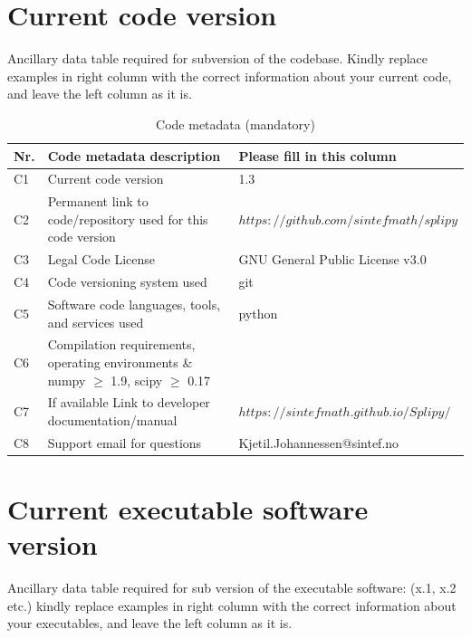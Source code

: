 \documentclass[preprint,12pt, a4paper]{elsarticle}
\begin{document}
\section*{Current code version}
\label{}

Ancillary data table required for subversion of the codebase. Kindly replace examples in right column with the correct information about your current code, and leave the left column as it is.

\begin{table}[!h]
\begin{tabular}{|l|p{6.5cm}|p{6.5cm}|}
\hline
\textbf{Nr.} & \textbf{Code metadata description} & \textbf{Please fill in this column} \\
\hline
C1 & Current code version & 1.3 \\
\hline
C2 & Permanent link to code/repository used for this code version & $https://github.com/sintefmath/splipy$ \\
\hline
C3 & Legal Code License   & GNU General Public License v3.0  \\
\hline
C4 & Code versioning system used & git \\
\hline
C5 & Software code languages, tools, and services used & python \\
\hline
C6 & Compilation requirements, operating environments \& numpy $\geq$ 1.9, scipy $\geq$ 0.17 \\
\hline
C7 & If available Link to developer documentation/manual & $https://sintefmath.github.io/Splipy/$ \\
\hline
C8 & Support email for questions & Kjetil.Johannessen@sintef.no \\
\hline
\end{tabular}
\caption{Code metadata (mandatory)}
\label{} 
\end{table}

\section*{Current executable software version}
\label{}

Ancillary data table required for sub version of the executable software: (x.1, x.2 etc.) kindly replace examples in right column with the correct information about your executables, and leave the left column as it is.
\end{document}
